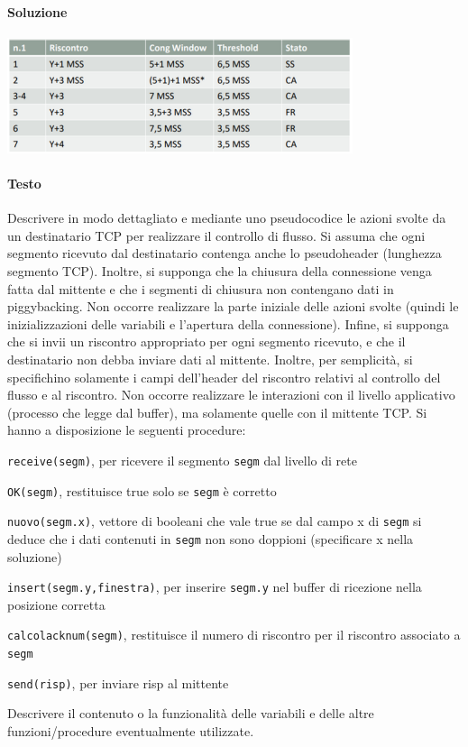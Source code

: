 \documentclass[10pt]{article}
\begin{document}
{\paragraph{Soluzione} 
\begin{center}
\includegraphics[scale=1]{es_tcp9testo.png}
\end{center}
\pagebreak
\paragraph{Testo} Descrivere in modo dettagliato e mediante uno pseudocodice le azioni svolte da un destinatario TCP per realizzare il controllo di flusso. Si assuma che ogni segmento ricevuto dal destinatario contenga anche lo pseudoheader (lunghezza segmento TCP). Inoltre, si supponga che la chiusura della connessione venga fatta dal mittente e che i segmenti di chiusura non contengano dati in piggybacking. Non occorre realizzare la parte iniziale delle azioni svolte (quindi le inizializzazioni delle variabili e l’apertura della connessione). Infine, si supponga che si invii un riscontro appropriato per ogni segmento ricevuto, e che il destinatario non debba inviare dati al mittente. Inoltre, per semplicità, si specifichino solamente i campi dell’header del riscontro relativi al controllo del flusso e al riscontro. Non occorre realizzare le interazioni con il livello applicativo (processo che legge dal buffer), ma solamente quelle con il mittente TCP. Si hanno a disposizione le seguenti procedure:
\begin{list}{}{}
\item \texttt{receive(segm)}, per ricevere il segmento \texttt{segm} dal livello di rete
\item \texttt{OK(segm)}, restituisce true solo se \texttt{segm} è corretto
\item \texttt{nuovo(segm.x)}, vettore di booleani che vale true se dal campo x di \texttt{segm} si deduce che i dati contenuti in \texttt{segm} non sono doppioni (specificare x nella soluzione)
\item \texttt{insert(segm.y,finestra)}, per inserire \texttt{segm.y} nel buffer di ricezione nella posizione corretta
\item \texttt{calcolacknum(segm)}, restituisce il numero di riscontro per il riscontro associato a \texttt{segm}
\item \texttt{send(risp)}, per inviare risp al mittente
\end{list}
Descrivere il contenuto o la funzionalità delle variabili e delle altre funzioni/procedure eventualmente utilizzate.
}
\end{document}
